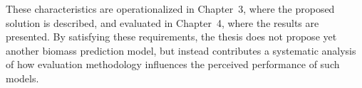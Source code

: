 These characteristics are operationalized in Chapter~3, where the proposed solution is described, and evaluated in Chapter~4, where the results are presented. By satisfying these requirements, the thesis does not propose yet another biomass prediction model, but instead contributes a systematic analysis of how evaluation methodology influences the perceived performance of such models.